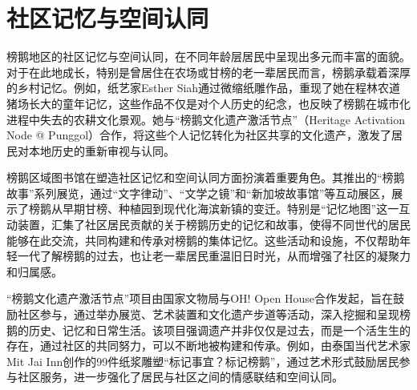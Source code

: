 \documentclass[11pt,a4paper,twoside,openany]{book}
\begin{document}
\section{社区记忆与空间认同}
榜鹅地区的社区记忆与空间认同，在不同年龄层居民中呈现出多元而丰富的面貌。对于在此地成长，特别是曾居住在农场或甘榜的老一辈居民而言，榜鹅承载着深厚的乡村记忆。例如，纸艺家Esther Siah通过微缩纸雕作品，重现了她在程林农道猪场长大的童年记忆，这些作品不仅是对个人历史的纪念，也反映了榜鹅在城市化进程中失去的农耕文化景观。她与“榜鹅文化遗产激活节点”（Heritage Activation Node @ Punggol）合作，将这些个人记忆转化为社区共享的文化遗产，激发了居民对本地历史的重新审视与认同。

榜鹅区域图书馆在塑造社区记忆和空间认同方面扮演着重要角色。其推出的“榜鹅故事”系列展览，通过“文字律动”、“文学之镜”和“新加坡故事馆”等互动展区，展示了榜鹅从早期甘榜、种植园到现代化海滨新镇的变迁。特别是“记忆地图”这一互动装置，汇集了社区居民贡献的关于榜鹅历史的记忆和故事，使得不同世代的居民能够在此交流，共同构建和传承对榜鹅的集体记忆。这些活动和设施，不仅帮助年轻一代了解榜鹅的过去，也让老一辈居民重温旧日时光，从而增强了社区的凝聚力和归属感。

“榜鹅文化遗产激活节点”项目由国家文物局与OH! Open House合作发起，旨在鼓励社区参与，通过举办展览、艺术装置和文化遗产步道等活动，深入挖掘和呈现榜鹅的历史、记忆和日常生活。该项目强调遗产并非仅仅是过去，而是一个活生生的存在，通过社区的共同努力，可以不断地被构建和传承。例如，由泰国当代艺术家Mit Jai Inn创作的99件纸浆雕塑“标记事宜？标记榜鹅”，通过艺术形式鼓励居民参与社区服务，进一步强化了居民与社区之间的情感联结和空间认同。
\end{document}
